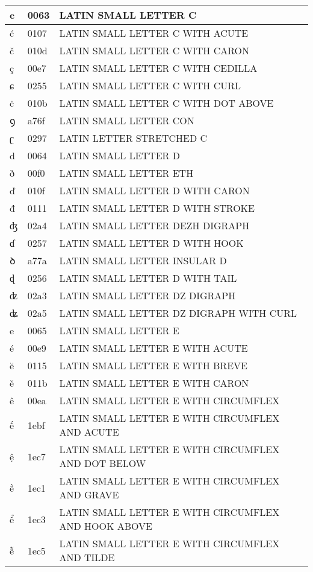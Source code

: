 \documentclass[12pt,letterpaper,openany]{book}
\begin{document}
\begin{center}
\begin{supertabular}{|m{0.25in}|m{0.5in}|m{4in}|}
c & 0063 & LATIN SMALL LETTER C\\\hline
ć & 0107 & LATIN SMALL LETTER C WITH ACUTE\\\hline
č & 010d & LATIN SMALL LETTER C WITH CARON\\\hline
ç & 00e7 & LATIN SMALL LETTER C WITH CEDILLA\\\hline
ɕ & 0255 & LATIN SMALL LETTER C WITH CURL\\\hline
ċ & 010b & LATIN SMALL LETTER C WITH DOT ABOVE\\\hline
ꝯ & a76f & LATIN SMALL LETTER CON\\\hline
ʗ & 0297 & LATIN LETTER STRETCHED C\\\hline
d & 0064 & LATIN SMALL LETTER D\\\hline
ð & 00f0 & LATIN SMALL LETTER ETH\\\hline
ď & 010f & LATIN SMALL LETTER D WITH CARON\\\hline
đ & 0111 & LATIN SMALL LETTER D WITH STROKE\\\hline
ʤ & 02a4 & LATIN SMALL LETTER DEZH DIGRAPH\\\hline
ɗ & 0257 & LATIN SMALL LETTER D WITH HOOK\\\hline
ꝺ & a77a & LATIN SMALL LETTER INSULAR D\\\hline
ɖ & 0256 & LATIN SMALL LETTER D WITH TAIL\\\hline
ʣ & 02a3 & LATIN SMALL LETTER DZ DIGRAPH\\\hline
ʥ & 02a5 & LATIN SMALL LETTER DZ DIGRAPH WITH CURL\\\hline
e & 0065 & LATIN SMALL LETTER E\\\hline
é & 00e9 & LATIN SMALL LETTER E WITH ACUTE\\\hline
ĕ & 0115 & LATIN SMALL LETTER E WITH BREVE\\\hline
ě & 011b & LATIN SMALL LETTER E WITH CARON\\\hline
ê & 00ea & LATIN SMALL LETTER E WITH CIRCUMFLEX\\\hline
ế & 1ebf & LATIN SMALL LETTER E WITH CIRCUMFLEX AND ACUTE\\\hline
ệ & 1ec7 & \scriptsize LATIN SMALL LETTER E WITH CIRCUMFLEX AND DOT BELOW\\\hline
ề & 1ec1 & LATIN SMALL LETTER E WITH CIRCUMFLEX AND GRAVE\\\hline
ể & 1ec3 & \scriptsize LATIN SMALL LETTER E WITH CIRCUMFLEX AND HOOK ABOVE\\\hline
ễ & 1ec5 & LATIN SMALL LETTER E WITH CIRCUMFLEX AND TILDE\\\hline

\end{supertabular}
\end{center}
\end{document}
